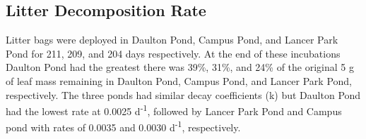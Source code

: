 \subsection{Litter Decomposition Rate}

Litter bags were deployed in Daulton Pond, Campus Pond, and Lancer Park Pond for 211, 209, and 204 days respectively. At the end of these incubations Daulton Pond had the greatest there was 39\%, 31\%, and 24\% of the original 5 g of leaf mass remaining in Daulton Pond, Campus Pond, and Lancer Park Pond, respectively. The three ponds had similar decay coefficients (k) but Daulton Pond had the lowest rate at 0.0025 d\textsuperscript{-1}, followed by Lancer Park Pond and Campus pond with rates of 0.0035 and 0.0030 d\textsuperscript{-1}, respectively.  




  
  